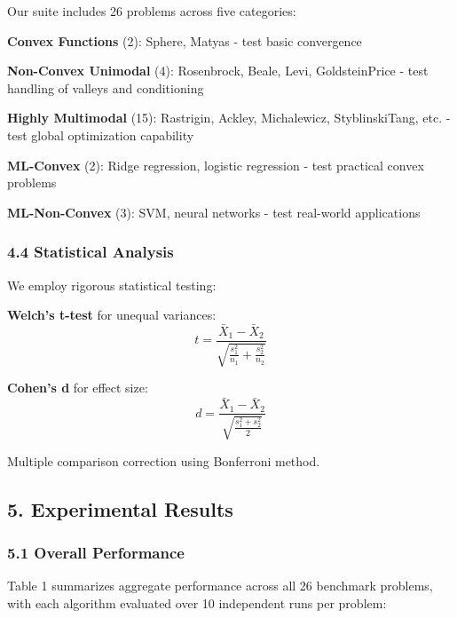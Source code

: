 Our suite includes 26 problems across five categories:

\textbf{Convex Functions} (2): Sphere, Matyas - test basic convergence

\textbf{Non-Convex Unimodal} (4): Rosenbrock, Beale, Levi, GoldsteinPrice - test handling of valleys and conditioning

\textbf{Highly Multimodal} (15): Rastrigin, Ackley, Michalewicz, StyblinskiTang, etc. - test global optimization capability

\textbf{ML-Convex} (2): Ridge regression, logistic regression - test practical convex problems

\textbf{ML-Non-Convex} (3): SVM, neural networks - test real-world applications

\hypertarget{statistical-analysis}{%
\subsubsection{4.4 Statistical Analysis}\label{statistical-analysis}}

We employ rigorous statistical testing:

\textbf{Welch's t-test} for unequal variances:
\[t = \frac{\bar{X}_1 - \bar{X}_2}{\sqrt{\frac{s_1^2}{n_1} + \frac{s_2^2}{n_2}}}\]

\textbf{Cohen's d} for effect size:
\[d = \frac{\bar{X}_1 - \bar{X}_2}{\sqrt{\frac{s_1^2 + s_2^2}{2}}}\]

Multiple comparison correction using Bonferroni method.

\hypertarget{experimental-results}{%
\subsection{5. Experimental Results}\label{experimental-results}}

\hypertarget{overall-performance}{%
\subsubsection{5.1 Overall Performance}\label{overall-performance}}

Table 1 summarizes aggregate performance across all 26 benchmark problems, with each algorithm evaluated over 10
independent runs per problem:

